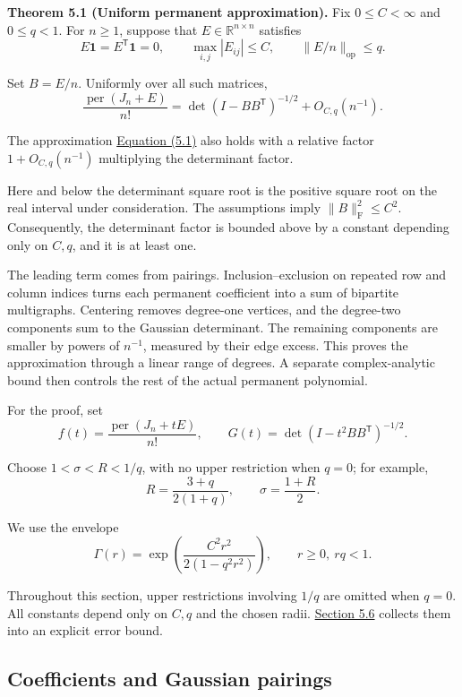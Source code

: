 \documentclass[11pt,a4paper]{article}
\makeatletter
\newcommand{\paperstatement}[3]{\par\addvspace{6pt}\Needspace{4\baselineskip}\phantomsection\def\@currentlabel{#2}\label{#3}\noindent\textbf{#1}\enspace}
\newcommand{\paperref}[2]{\hyperref[#1]{#2}}
\makeatother
\begin{document}
\paperstatement{Theorem 5.1 (Uniform permanent approximation).}{5.1}{thm-5.1} Fix \(0\le C<\infty\) and \(0\le q<1\). For \(n\ge1\), suppose that \(E\in\mathbb R^{n\times n}\) satisfies
\[E\mathbf1=E^{\mathsf T}\mathbf1=0,\qquad
\max_{i,j}|E_{ij}|\le C,\qquad
\|E/n\|_{\mathrm{op}}\le q.\]

Set \(B=E/n\). Uniformly over all such matrices,
\begin{equation}
\frac{\operatorname{per}(J_n+E)}{n!}
=\det(I-BB^{\mathsf T})^{-1/2}+O_{C,q}(n^{-1}).
\tag{5.1}\label{eq-uniform-permanent}
\end{equation}

The approximation \paperref{eq-uniform-permanent}{Equation (5.1)} also holds with a relative factor \(1+O_{C,q}(n^{-1})\) multiplying the determinant factor.

Here and below the determinant square root is the positive square root on the real interval under consideration. The assumptions imply \(\|B\|_{\mathrm F}^2\le C^2\). Consequently, the determinant factor is bounded above by a constant depending only on \(C,q\), and it is at least one.

The leading term comes from pairings. Inclusion--exclusion on repeated row and column indices turns each permanent coefficient into a sum of bipartite multigraphs. Centering removes degree-one vertices, and the degree-two components sum to the Gaussian determinant. The remaining components are smaller by powers of \(n^{-1}\), measured by their edge excess. This proves the approximation through a linear range of degrees. A separate complex-analytic bound then controls the rest of the actual permanent polynomial.

For the proof, set
\[f(t)=\frac{\operatorname{per}(J_n+tE)}{n!},
\qquad G(t)=\det(I-t^2BB^{\mathsf T})^{-1/2}.\]

Choose \(1<\sigma<R<1/q\), with no upper restriction when \(q=0\); for example,
\[R=\frac{3+q}{2(1+q)},\qquad \sigma=\frac{1+R}{2}.\]

We use the envelope
\[\Gamma(r)=\exp\left(\frac{C^2r^2}{2(1-q^2r^2)}\right),
\qquad r\ge0,\ rq<1.\]

Throughout this section, upper restrictions involving \(1/q\) are omitted when \(q=0\). All constants depend only on \(C,q\) and the chosen radii. \paperref{sec-5.6}{Section 5.6} collects them into an explicit error bound.

\subsection{Coefficients and Gaussian pairings}\label{sec-5.2}
\end{document}

